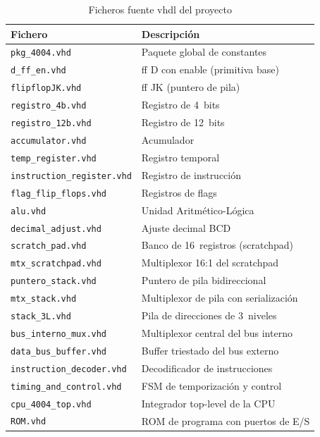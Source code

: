 \documentclass[%
    school=etsisi,%
    type=pfg,%
    degree=61CI,%
]{upm-report}
\begin{document}
\begin{table}[H]
\centering
\caption{Ficheros fuente \acrshort{vhdl} del proyecto}
\label{tab:ficheros}
\begin{tabularx}{\textwidth}{@{}lX@{}}
\toprule
\textbf{Fichero} & \textbf{Descripción} \\
\midrule
\texttt{pkg\_4004.vhd}             & Paquete global de constantes \\
\texttt{d\_ff\_en.vhd}             & \acrshort{ff} D con enable (primitiva base) \\
\texttt{flipflopJK.vhd}            & \acrshort{ff} JK (puntero de pila) \\
\texttt{registro\_4b.vhd}          & Registro de 4~bits \\
\texttt{registro\_12b.vhd}         & Registro de 12~bits \\
\texttt{accumulator.vhd}           & Acumulador \\
\texttt{temp\_register.vhd}        & Registro temporal \\
\texttt{instruction\_register.vhd} & Registro de instrucción \\
\texttt{flag\_flip\_flops.vhd}     & Registros de flags \\
\texttt{alu.vhd}                   & Unidad Aritmético-Lógica \\
\texttt{decimal\_adjust.vhd}       & Ajuste decimal BCD \\
\texttt{scratch\_pad.vhd}          & Banco de 16~registros (scratchpad) \\
\texttt{mtx\_scratchpad.vhd}       & Multiplexor 16:1 del scratchpad \\
\texttt{puntero\_stack.vhd}        & Puntero de pila bidireccional \\
\texttt{mtx\_stack.vhd}            & Multiplexor de pila con serialización \\
\texttt{stack\_3L.vhd}             & Pila de direcciones de 3~niveles \\
\texttt{bus\_interno\_mux.vhd}     & Multiplexor central del bus interno \\
\texttt{data\_bus\_buffer.vhd}     & Buffer triestado del bus externo \\
\texttt{instruction\_decoder.vhd}  & Decodificador de instrucciones \\
\texttt{timing\_and\_control.vhd}  & FSM de temporización y control \\
\texttt{cpu\_4004\_top.vhd}        & Integrador top-level de la CPU \\
\texttt{ROM.vhd}                   & ROM de programa con puertos de E/S \\

\end{tabularx}
\end{table}
\end{document}
